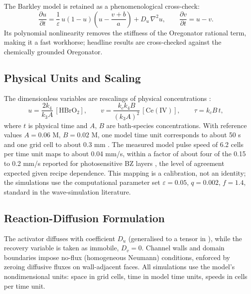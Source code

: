 The Barkley model \cite{barkley1991model} is retained as a phenomenological cross-check:
\begin{equation}
\frac{\partial u}{\partial t} = \frac{1}{\varepsilon}\,u\left(1 - u\right)\left(u - \frac{v + b}{a}\right) + D_{u}\,\nabla^{2}u,
\qquad
\frac{\partial v}{\partial t} = u - v.
\label{eq:barkley}
\end{equation}
Its polynomial nonlinearity removes the stiffness of the Oregonator rational term, making it a fast workhorse; headline results are cross-checked against the chemically grounded Oregonator.

\subsection{Physical Units and Scaling}
\label{sec:meth_scaling}

The dimensionless variables are rescalings of physical concentrations \cite{tyson1980target}:
\begin{equation}
u = \frac{2 k_{4}}{k_{3} A}\,[\mathrm{HBrO_{2}}],
\qquad
v = \frac{k_{c} k_{4} B}{(k_{3} A)^{2}}\,[\mathrm{Ce(IV)}],
\qquad
\tau = k_{c} B\,t,
\label{eq:tyson_fife_scaling}
\end{equation}
where $t$ is physical time and $A$, $B$ are bath-species concentrations.
With reference values $A = 0.06$ M, $B = 0.02$ M, one model time unit corresponds to about 50 s and one grid cell to about 0.3 mm \cite{field1986oxybromine}.
The measured model pulse speed of 6.2 cells per time unit maps to about 0.04 mm/s, within a factor of about four of the 0.15 to 0.2 mm/s reported for photosensitive BZ layers \cite{suematsu2021instability}, the level of agreement expected given recipe dependence.
This mapping is a calibration, not an identity; the simulations use the computational parameter set $\varepsilon = 0.05$, $q = 0.002$, $f = 1.4$, standard in the wave-simulation literature.

\subsection{Reaction-Diffusion Formulation}
\label{sec:meth_rd}

The activator diffuses with coefficient $D_{u}$ (generalised to a tensor in ), while the recovery variable is taken as immobile, $D_{v} = 0$.
Channel walls and domain boundaries impose no-flux (homogeneous Neumann) conditions, enforced by zeroing diffusive fluxes on wall-adjacent faces.
All simulations use the model's nondimensional units: space in grid cells, time in model time units, speeds in cells per time unit.

